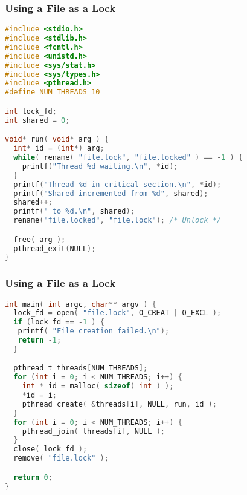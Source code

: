 \begin{frame}[fragile]
	\frametitle{Using a File as a Lock}
	\begin{lstlisting}[language=C]
#include <stdio.h>
#include <stdlib.h>
#include <fcntl.h>
#include <unistd.h>
#include <sys/stat.h>
#include <sys/types.h>
#include <pthread.h>
#define NUM_THREADS 10

int lock_fd;
int shared = 0;

void* run( void* arg ) {
  int* id = (int*) arg;
  while( rename( "file.lock", "file.locked" ) == -1 ) {
    printf("Thread %d waiting.\n", *id); 
  }
  printf("Thread %d in critical section.\n", *id);
  printf("Shared incremented from %d", shared);
  shared++;
  printf(" to %d.\n", shared);
  rename("file.locked", "file.lock"); /* Unlock */

  free( arg );
  pthread_exit(NULL);
}
\end{lstlisting}

\end{frame}

\begin{frame}[fragile]
	\frametitle{Using a File as a Lock}
	\begin{lstlisting}[language=C]
int main( int argc, char** argv ) {
  lock_fd = open( "file.lock", O_CREAT | O_EXCL );  
  if (lock_fd == -1 ) {
   printf( "File creation failed.\n");
   return -1;
  }

  pthread_t threads[NUM_THREADS];
  for (int i = 0; i < NUM_THREADS; i++) {
    int * id = malloc( sizeof( int ) );
    *id = i;
    pthread_create( &threads[i], NULL, run, id );
  }
  for (int i = 0; i < NUM_THREADS; i++) {
    pthread_join( threads[i], NULL );
  }
  close( lock_fd );
  remove( "file.lock" );

  return 0;
}
\end{lstlisting}
\end{frame}



